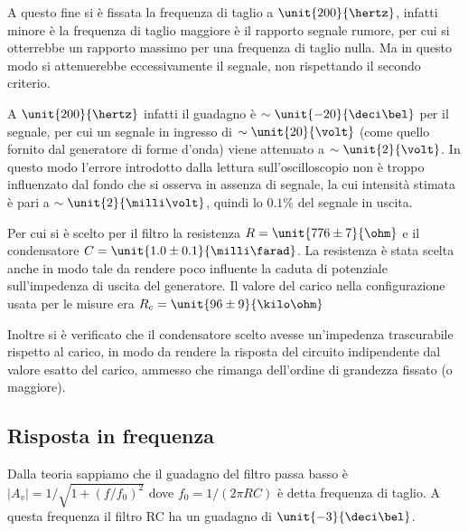 \documentclass[10pt,a4paper]{article}
\begin{document}
A questo fine si è fissata la frequenza di taglio a $\unit{200}{\hertz}$, infatti minore è la frequenza di taglio maggiore è il rapporto segnale rumore, per cui si otterrebbe un rapporto massimo per una frequenza di taglio nulla. Ma in questo modo si attenuerebbe eccessivamente il segnale, non rispettando il secondo criterio.


A $\unit{200}{\hertz}$ infatti il guadagno è $\sim \unit{-20}{\deci\bel}$ per il segnale, per cui un segnale in ingresso di $\sim \unit{20}{\volt}$ (come quello fornito dal generatore di forme d'onda) viene attenuato a $\sim \unit{2}{\volt}$. In questo modo l'errore introdotto dalla lettura sull'oscilloscopio non è troppo influenzato dal fondo che si osserva in assenza di segnale, la cui intensità stimata è pari a $\sim \unit{2}{\milli\volt}$, quindi lo $0.1\%$ del segnale in uscita.

Per cui si è scelto per il filtro la resistenza $R = \unit{776 \pm 7}{\ohm}$ e il condensatore $C = \unit{1.0 \pm 0.1}{\milli\farad}$. La resistenza è stata scelta anche in modo tale da rendere poco influente la caduta di potenziale sull'impedenza di uscita del generatore. Il valore del carico nella configurazione usata per le misure era $R_{c} = \unit{96 \pm 9}{\kilo\ohm}$

Inoltre si è verificato che il condensatore scelto avesse un'impedenza trascurabile rispetto al carico, in modo da rendere la risposta del circuito indipendente dal valore esatto del carico, ammesso che rimanga dell'ordine di grandezza fissato (o maggiore).

\subsection{Risposta in frequenza}
Dalla teoria sappiamo che il guadagno del filtro passa basso è $|A_v|=1/\sqrt{1+(f/f_0)^2}$ dove $f_0 = 1/(2 \pi RC)$ è detta frequenza di taglio. A questa frequenza il filtro RC ha un guadagno di $\unit{-3}{\deci\bel}$.
\end{document}

